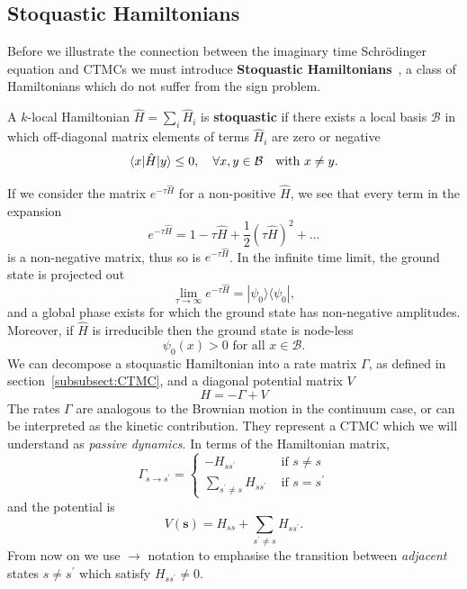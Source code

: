 \subsection{Stoquastic Hamiltonians}
\label{subsec:fk-latt}
Before we illustrate the connection between the imaginary time Schr\" odinger equation and CTMCs we must introduce \textbf{Stoquastic Hamiltonians}~\cite{bravyi2006complexity}, a class of Hamiltonians which do not suffer from the sign problem.
\begin{definition}
	A $k$-local Hamiltonian $\hat H=\sum_{i} \hat H_{i}$ is \textbf{stoquastic} if there exists a local basis $\mathcal{B}$ in which off-diagonal matrix elements of terms $\hat{H}_i$ are zero or negative
	\begin{equation}
		\langle x|\hat H| y\rangle \leq 0, \quad \forall x, y \in \mathcal{B} \text {\quad with } x \neq y.
	\end{equation}
\end{definition}
\noindent
If we consider the matrix $e^{-\tau \hat H}$ for a non-positive $\hat H$, we see that every term in the expansion
\begin{equation}
	e^{-\tau \hat{H}} = 1 -\tau \hat{H} + \frac{1}{2}(\tau \hat{H})^2 + \ldots
\end{equation}
is a non-negative matrix, thus so is $e^{-\tau \hat H}$. In the infinite time limit, the ground state is projected out
\begin{equation}
	\lim _{\tau \rightarrow \infty} e^{-\tau \hat H}=|\psi_0\rangle\langle\psi_0|, 
\end{equation}
and a global phase exists for which the ground state has non-negative amplitudes. Moreover, if $\hat H$ is irreducible then the ground state is node-less~\cite{discussion_stoquastic2017}
\begin{equation}
	\psi_0(x)>0 \text { for all } x \in \mathcal{B}.
\end{equation}
We can decompose a stoquastic Hamiltonian into a rate matrix $\Gamma$, as defined in section~\ref{subsubsect:CTMC}, and a diagonal potential matrix $V$
\begin{equation}
	\label{eq:hamilton_split}
	H = -\Gamma + V
\end{equation}
The rates $\Gamma$ are analogous to the Brownian motion in the continuum case, or can be interpreted as the kinetic contribution. They represent a CTMC which we will understand as \emph{passive dynamics}. In terms of the Hamiltonian matrix,
\begin{equation}
\Gamma_{s \rightarrow s^{\prime}}=\left\{\begin{array}{ll}
-H_{s s^{\prime}} & \text { if } s \neq s \\
\sum_{s^{\prime} \neq s} H_{s s^{\prime}} & \text { if } s=s^{\prime}
\end{array}\right.
\end{equation}
and the potential is
\begin{equation}
V(\boldsymbol{s})=H_{s s}+\sum_{s^{\prime} \neq s} H_{s s^{\prime}}.
\end{equation}
From now on we use $\rightarrow$ notation to emphasise the transition between \emph{adjacent} states $s\neq s^\prime$ which satisfy $H_{s s^{\prime}} \neq 0$. 

